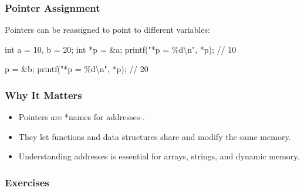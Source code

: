 \documentclass[
  letterpaper,
  DIV=11,
  numbers=noendperiod]{scrreprt}
\newenvironment{Shaded}{\begin{snugshade}}{\end{snugshade}}
\newcommand{\CommentTok}[1]{\textcolor[rgb]{0.37,0.37,0.37}{#1}}
\newcommand{\DataTypeTok}[1]{\textcolor[rgb]{0.68,0.00,0.00}{#1}}
\newcommand{\DecValTok}[1]{\textcolor[rgb]{0.68,0.00,0.00}{#1}}
\newcommand{\NormalTok}[1]{\textcolor[rgb]{0.00,0.23,0.31}{#1}}
\newcommand{\OperatorTok}[1]{\textcolor[rgb]{0.37,0.37,0.37}{#1}}
\newcommand{\SpecialCharTok}[1]{\textcolor[rgb]{0.37,0.37,0.37}{#1}}
\newcommand{\StringTok}[1]{\textcolor[rgb]{0.13,0.47,0.30}{#1}}
\providecommand{\tightlist}{%
  \setlength{\itemsep}{0pt}\setlength{\parskip}{0pt}}
\begin{document}
\subsubsection{Pointer Assignment}\label{pointer-assignment}

Pointers can be reassigned to point to different variables:

\begin{Shaded}
\begin{Highlighting}[]
\DataTypeTok{int}\NormalTok{ a }\OperatorTok{=} \DecValTok{10}\OperatorTok{,}\NormalTok{ b }\OperatorTok{=} \DecValTok{20}\OperatorTok{;}
\DataTypeTok{int} \OperatorTok{*}\NormalTok{p }\OperatorTok{=} \OperatorTok{\&}\NormalTok{a}\OperatorTok{;}
\NormalTok{printf}\OperatorTok{(}\StringTok{"*p = }\SpecialCharTok{\%d\textbackslash{}n}\StringTok{"}\OperatorTok{,} \OperatorTok{*}\NormalTok{p}\OperatorTok{);}  \CommentTok{// 10}

\NormalTok{p }\OperatorTok{=} \OperatorTok{\&}\NormalTok{b}\OperatorTok{;}
\NormalTok{printf}\OperatorTok{(}\StringTok{"*p = }\SpecialCharTok{\%d\textbackslash{}n}\StringTok{"}\OperatorTok{,} \OperatorTok{*}\NormalTok{p}\OperatorTok{);}  \CommentTok{// 20}
\end{Highlighting}
\end{Shaded}

\subsubsection{Why It Matters}\label{why-it-matters-30}

\begin{itemize}
\tightlist
\item
  Pointers are *names for addresses-.
\item
  They let functions and data structures share and modify the same
  memory.
\item
  Understanding addresses is essential for arrays, strings, and dynamic
  memory.
\end{itemize}

\subsubsection{Exercises}\label{exercises-31}
\end{document}
